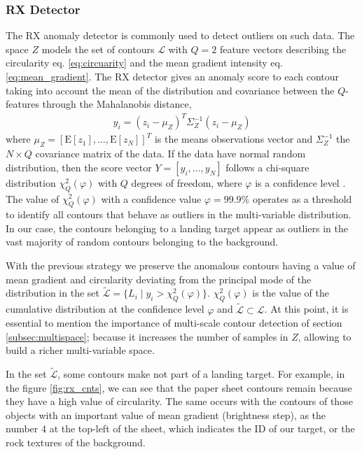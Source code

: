 \subsubsection{RX Detector}\label{subsec:rx_detector}
The RX anomaly detector \citep{Reed.Yu:TASSP:1990} is commonly used to detect outliers on such data. The space $Z$ models the set of contours $\mathcal{L}$ with $Q=2$ feature vectors describing the circularity eq. \eqref{eq:circuarity} and the mean gradient intensity eq. \eqref{eq:mean_gradient}. The RX detector gives an anomaly score to each contour taking into account the mean of the distribution and covariance between the $Q$-features through the Mahalanobis distance,
\begin{eqnarray}\label{eq:RX_detector}
y_{i}= (z_{i}-\mu_{Z})^{T}\Sigma^{-1}_{Z}(z_{i}-\mu_{Z})
\end{eqnarray}
where $\mu_{Z}=[\mathrm{E}[z_{1}], \ldots, \mathrm{E}[z_{N}]]^T$ is the means observations vector and $\Sigma^{-1}_{Z}$ the $N\times Q$ covariance matrix of the data. If the data have normal random distribution, then the score vector $Y=[y_{i}, \ldots, y_{N}]$ follows a chi-square distribution $\chi^{2}_{Q}(\varphi)$ with $Q$ degrees of freedom, where $\varphi$ is a confidence level \citep{Lu.Chen.ea:IJAIT:2004}. The value of $\chi^{2}_{Q}(\varphi)$ with a confidence value $\varphi=99.9\%$ operates as a threshold to identify all contours that behave as outliers in the multi-variable distribution. In our case, the contours belonging to a landing target appear as outliers in the vast majority of random contours belonging to the background.

With the previous strategy we preserve the anomalous contours having a value of mean gradient and circularity deviating from the principal mode of the distribution in the set $\widetilde{\mathcal{L}}=\{L_{i}\mid y_{i}>\chi^{2}_{Q}(\varphi)\}$. $\chi^{2}_{Q}(\varphi)$ is the value of the cumulative distribution at the confidence level $\varphi$ and $\widetilde{\mathcal{L}} \subset \mathcal{L}$. At this point, it is essential to mention the importance of multi-scale contour detection of section \ref{subsec:multispace}; because it increases the number of samples in $Z$, allowing to build a richer multi-variable space.

In the set $\widetilde{\mathcal{L}}$, some contours make not part of a landing target. For example, in the figure \ref{fig:rx_cnts}, we can see that the paper sheet contours remain because they have a high value of circularity. The same occurs with the contours of those objects with an important value of mean gradient (brightness step), as the number 4 at the top-left of the sheet, which indicates the ID of our target, or the rock textures of the background.

